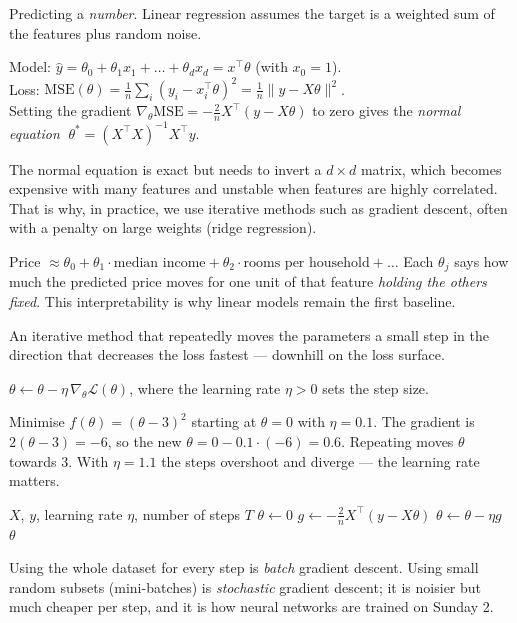\documentclass[11pt,a4paper]{article}
\begin{document}
\begin{bdef}[Regression]
Predicting a \emph{number}. Linear regression assumes the target is a weighted sum of the features plus random noise.
\end{bdef}
\begin{bmath}
Model: $\hat y=\theta_0+\theta_1x_1+\dots+\theta_dx_d=x^\top\theta$ (with $x_0=1$).\\[3pt]
Loss: $\mathrm{MSE}(\theta)=\frac1n\sum_i(y_i-x_i^\top\theta)^2=\frac1n\lVert y-X\theta\rVert^2$.\\[3pt]
Setting the gradient $\nabla_\theta\mathrm{MSE}=-\frac2nX^\top(y-X\theta)$ to zero gives the \emph{normal equation} $\;\theta^\ast=(X^\top X)^{-1}X^\top y$.
\end{bmath}
The normal equation is exact but needs to invert a $d\times d$ matrix, which becomes expensive with many features and unstable when features are highly correlated. That is why, in practice, we use iterative methods such as gradient descent, often with a penalty on large weights (ridge regression).

\begin{bex}
Price $\approx \theta_0 + \theta_1\cdot\text{median income} + \theta_2\cdot\text{rooms per household}+\dots$ Each $\theta_j$ says how much the predicted price moves for one unit of that feature \emph{holding the others fixed}. This interpretability is why linear models remain the first baseline.
\end{bex}

\begin{bdef}
An iterative method that repeatedly moves the parameters a small step in the direction that decreases the loss fastest --- downhill on the loss surface.
\end{bdef}
\begin{bmath}
$\theta\leftarrow\theta-\eta\,\nabla_\theta\mathcal{L}(\theta)$, \;where the learning rate $\eta>0$ sets the step size.
\end{bmath}
\begin{bex}
Minimise $f(\theta)=(\theta-3)^2$ starting at $\theta=0$ with $\eta=0.1$. The gradient is $2(\theta-3)=-6$, so the new $\theta=0-0.1\cdot(-6)=0.6$. Repeating moves $\theta$ towards 3. With $\eta=1.1$ the steps overshoot and diverge --- the learning rate matters.
\end{bex}
\begin{balgo}
\begin{algorithmic}[1]
\Require $X$, $y$, learning rate $\eta$, number of steps $T$
\State $\theta\gets 0$
  \State $g\gets -\frac{2}{n}X^\top(y-X\theta)$ 
  \State $\theta\gets\theta-\eta g$
\EndFor
\State \Return $\theta$
\end{algorithmic}
\end{balgo}
Using the whole dataset for every step is \emph{batch} gradient descent. Using small random subsets (mini-batches) is \emph{stochastic} gradient descent; it is noisier but much cheaper per step, and it is how neural networks are trained on Sunday 2.
\end{document}
